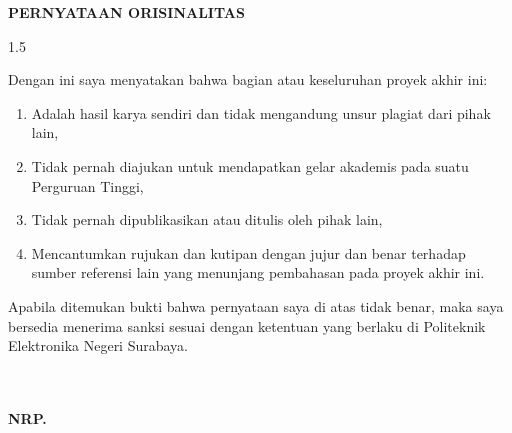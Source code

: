 \thispagestyle{fancy}

\begin{center}
  {\FontPernyataanLabel\bfseries PERNYATAAN ORISINALITAS\par}
\end{center}
\vspace{1.5cm}

{\FontPernyataanIsi
  \begin{spacing}{1.5}

    \noindent Dengan ini saya menyatakan bahwa bagian atau keseluruhan proyek akhir ini:

    \begin{enumerate}[label=\arabic*., leftmargin=*]
      \item Adalah hasil karya sendiri dan tidak mengandung unsur plagiat dari pihak lain,
      \item Tidak pernah diajukan untuk mendapatkan gelar akademis pada suatu Perguruan Tinggi,
      \item Tidak pernah dipublikasikan atau ditulis oleh pihak lain,
      \item Mencantumkan rujukan dan kutipan dengan jujur dan benar terhadap sumber referensi
        lain yang menunjang pembahasan pada proyek akhir ini.
    \end{enumerate}

    Apabila ditemukan bukti bahwa pernyataan saya di atas tidak benar, maka saya bersedia
    menerima sanksi sesuai dengan ketentuan yang berlaku di Politeknik Elektronika Negeri
    Surabaya.

  \end{spacing}

  \vspace{2.5cm}

  \hfill
  \begin{minipage}{6.5cm}
    \TanggalSidang\\[2cm]
    \underline{\bfseries \NamaMahasiswa}\\
    \bfseries NRP. \NRP
  \end{minipage}
}